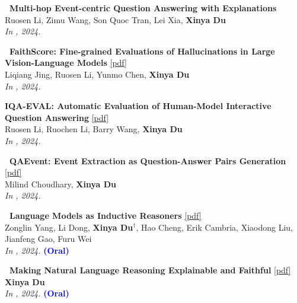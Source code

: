 \begin{enumerate}[{[}1{]},leftmargin=*]
\item 
{\bf\ Multi-hop Event-centric Question Answering with Explanations} \\
Ruosen Li, Zimu Wang, Son Quoc Tran, Lei Xia, \textbf{Xinya Du}  \\
{\it In \Neurips, 2024.} \\



\item 
{\bf\ FaithScore: Fine-grained Evaluations of Hallucinations in Large Vision-Language Models} 
\href{https://arxiv.org/pdf/2311.01477}{{[pdf]}} \\
Liqiang Jing, Ruosen Li, Yunmo Chen, \textbf{Xinya Du}  \\
{\it In \EMNLPfinding, 2024.} \\


\item
{\bf IQA-EVAL: Automatic Evaluation of Human-Model Interactive Question Answering}  
\href{https://arxiv.org/pdf/2408.13545}{{[pdf]}} \\
Ruosen Li, Ruochen Li, Barry Wang, \textbf{Xinya Du} \\
{\it In \Neurips, 2024.} \\



\item 
{\bf\ QAEvent: Event Extraction as Question-Answer Pairs Generation} 
\href{https://aclanthology.org/2024.findings-eacl.126.pdf}{{[pdf]}} \\
Milind Choudhary, \textbf{Xinya Du} \\
{\it In \EACLfinding, 2024.} \\

\item 
{\bf\ Language Models as Inductive Reasoners} 
\href{https://aclanthology.org/2024.eacl-long.13.pdf}{{[pdf]}} \\
Zonglin Yang, Li Dong, \textbf{Xinya Du}$^{\dagger}$, Hao Cheng, Erik Cambria, Xiaodong Liu, Jianfeng Gao, Furu Wei \\
{\it In \EACL, 2024.} {\textcolor{blue}{\textbf{(Oral)}}} \\ 

\item 
{\bf\ Making Natural Language Reasoning Explainable and Faithful} 
      \href{https://ojs.aaai.org/index.php/AAAI/article/view/30280}{{[pdf]}} \\
      \textbf{Xinya Du} \\
{\it In \AAAI, 2024.} {\textcolor{blue}{\textbf{(Oral)}}} \\ 



\end{enumerate}
